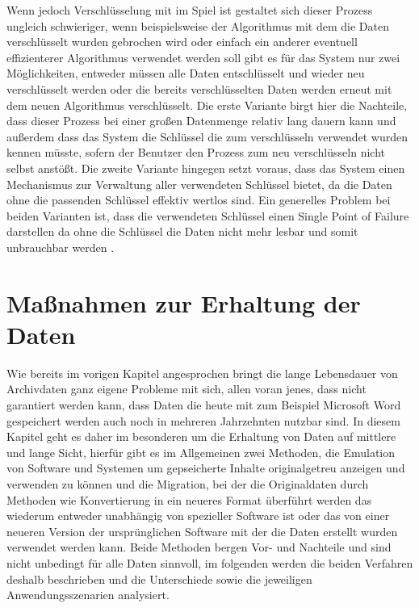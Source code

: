 \documentclass[conference,compsoc,final,a4paper]{IEEEtran}
\begin{document}
Wenn jedoch Verschlüsselung mit im Spiel ist gestaltet sich dieser Prozess ungleich schwieriger, wenn beispielsweise der Algorithmus mit dem die Daten verschlüsselt wurden gebrochen wird oder einfach ein anderer eventuell effizienterer Algorithmus verwendet werden soll gibt es für das System nur zwei Möglichkeiten, entweder müssen alle Daten entschlüsselt und wieder neu verschlüsselt werden oder die bereits verschlüsselten Daten werden erneut mit dem neuen Algorithmus verschlüsselt. Die erste Variante birgt hier die Nachteile, dass dieser Prozess bei einer großen Datenmenge relativ lang dauern kann und außerdem dass das System die Schlüssel die zum verschlüsseln verwendet wurden kennen müsste, sofern der Benutzer den Prozess zum neu verschlüsseln nicht selbst anstößt. Die zweite Variante hingegen setzt voraus, dass das System einen Mechanismus zur Verwaltung aller verwendeten Schlüssel bietet, da die Daten ohne die passenden Schlüssel effektiv wertlos sind. Ein generelles Problem bei beiden Varianten ist, dass die verwendeten Schlüssel einen Single Point of Failure darstellen da ohne die Schlüssel die Daten nicht mehr lesbar und somit unbrauchbar werden \autocite{Storer2006}.

\section{Maßnahmen zur Erhaltung der Daten}
Wie bereits im vorigen Kapitel angesprochen bringt die lange Lebensdauer von Archivdaten ganz eigene Probleme mit sich, allen voran jenes, dass nicht garantiert werden kann, dass Daten die heute mit zum Beispiel Microsoft Word gespeichert werden auch noch in mehreren Jahrzehnten nutzbar sind. In diesem Kapitel geht es daher im besonderen um die Erhaltung von Daten auf mittlere und lange Sicht, hierfür gibt es im Allgemeinen zwei Methoden, die Emulation von Software und Systemen um gepseicherte Inhalte originalgetreu anzeigen und verwenden zu können und die Migration, bei der die Originaldaten durch Methoden wie Konvertierung in ein neueres Format überführt werden das wiederum entweder unabhängig von spezieller Software ist oder das von einer neueren Version der ursprünglichen Software mit der die Daten erstellt wurden verwendet werden kann. Beide Methoden bergen Vor- und Nachteile und sind nicht unbedingt für alle Daten sinnvoll, im folgenden werden die beiden Verfahren deshalb beschrieben und die Unterschiede sowie die jeweiligen Anwendungsszenarien analysiert.
\end{document}
